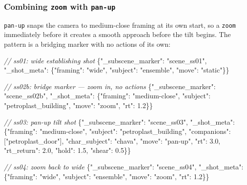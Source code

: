 \documentclass[
  12pt,
  letterpaper,
]{book}
\newenvironment{Shaded}{}{}
\newcommand{\CommentTok}[1]{\textcolor[rgb]{0.38,0.63,0.69}{\textit{#1}}}
\newcommand{\DataTypeTok}[1]{\textcolor[rgb]{0.56,0.13,0.00}{#1}}
\newcommand{\FloatTok}[1]{\textcolor[rgb]{0.25,0.63,0.44}{#1}}
\newcommand{\FunctionTok}[1]{\textcolor[rgb]{0.02,0.16,0.49}{#1}}
\newcommand{\NormalTok}[1]{#1}
\newcommand{\StringTok}[1]{\textcolor[rgb]{0.25,0.44,0.63}{#1}}
\begin{document}
\subsubsection{Combining \texttt{zoom} with \texttt{pan-up}}\label{zoom-with-pan-up}

\texttt{pan-up} snaps the camera to medium-close framing at its own
start, so a \texttt{zoom} immediately before it creates a smooth
approach before the tilt begins. The pattern is a bridging marker with
no actions of its own:

\begin{Shaded}
\begin{Highlighting}[]
\CommentTok{// ss01: wide establishing shot}
\FunctionTok{\{}\DataTypeTok{"\_subscene\_marker"}\NormalTok{: }\StringTok{"scene\_ss01"}\NormalTok{, }\DataTypeTok{"\_shot\_meta"}\NormalTok{: \{}\DataTypeTok{"framing"}\NormalTok{: }\StringTok{"wide"}\NormalTok{,}
\NormalTok{  }\DataTypeTok{"subject"}\NormalTok{: }\StringTok{"ensemble"}\NormalTok{, }\DataTypeTok{"move"}\NormalTok{: }\StringTok{"static"}\NormalTok{\}\}}

\CommentTok{// ss02b: bridge marker — zoom in, no actions}
\FunctionTok{\{}\DataTypeTok{"\_subscene\_marker"}\NormalTok{: }\StringTok{"scene\_ss02b"}\NormalTok{, }\DataTypeTok{"\_shot\_meta"}\NormalTok{: \{}\DataTypeTok{"framing"}\NormalTok{: }\StringTok{"medium-close"}\NormalTok{,}
\NormalTok{  }\DataTypeTok{"subject"}\NormalTok{: }\StringTok{"petroplast\_building"}\NormalTok{, }\DataTypeTok{"move"}\NormalTok{: }\StringTok{"zoom"}\NormalTok{, }\DataTypeTok{"rt"}\NormalTok{: }\FloatTok{1.2}\NormalTok{\}\}}

\CommentTok{// ss03: pan-up tilt shot}
\FunctionTok{\{}\DataTypeTok{"\_subscene\_marker"}\NormalTok{: }\StringTok{"scene\_ss03"}\NormalTok{, }\DataTypeTok{"\_shot\_meta"}\NormalTok{: \{}\DataTypeTok{"framing"}\NormalTok{: }\StringTok{"medium-close"}\NormalTok{,}
\NormalTok{  }\DataTypeTok{"subject"}\NormalTok{: }\StringTok{"petroplast\_building"}\NormalTok{, }\DataTypeTok{"companions"}\NormalTok{: [}\StringTok{"petroplast\_door"}\NormalTok{],}
\NormalTok{  }\DataTypeTok{"char\_subject"}\NormalTok{: }\StringTok{"chava"}\NormalTok{, }\DataTypeTok{"move"}\NormalTok{: }\StringTok{"pan-up"}\NormalTok{,}
\NormalTok{  }\DataTypeTok{"rt"}\NormalTok{: }\FloatTok{3.0}\NormalTok{, }\DataTypeTok{"rt\_return"}\NormalTok{: }\FloatTok{2.0}\NormalTok{, }\DataTypeTok{"hold"}\NormalTok{: }\FloatTok{1.5}\NormalTok{, }\DataTypeTok{"shear"}\NormalTok{: }\FloatTok{0.5}\NormalTok{\}\}}

\CommentTok{// ss04: zoom back to wide}
\FunctionTok{\{}\DataTypeTok{"\_subscene\_marker"}\NormalTok{: }\StringTok{"scene\_ss04"}\NormalTok{, }\DataTypeTok{"\_shot\_meta"}\NormalTok{: \{}\DataTypeTok{"framing"}\NormalTok{: }\StringTok{"wide"}\NormalTok{,}
\NormalTok{  }\DataTypeTok{"subject"}\NormalTok{: }\StringTok{"ensemble"}\NormalTok{, }\DataTypeTok{"move"}\NormalTok{: }\StringTok{"zoom"}\NormalTok{, }\DataTypeTok{"rt"}\NormalTok{: }\FloatTok{1.2}\NormalTok{\}\}}
\end{Highlighting}
\end{Shaded}
\end{document}
